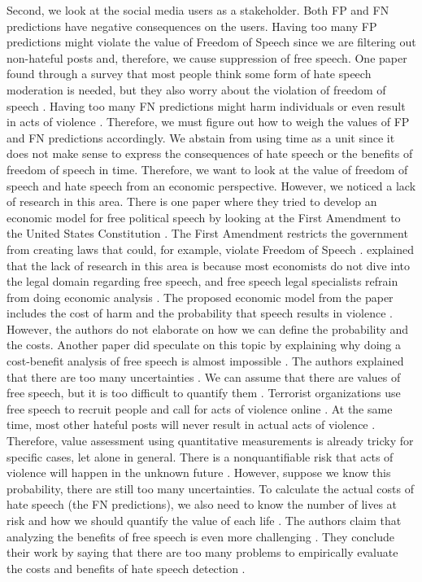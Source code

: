 Second, we look at the social media users as a stakeholder.
%
Both FP and FN predictions have negative consequences on the users.
%
Having too many FP predictions might violate the value of Freedom of Speech since we are filtering out non-hateful posts and, therefore, we cause suppression of free speech.
%
One paper found through a survey that most people think some form of hate speech moderation is needed, but they also worry about the violation of freedom of speech \citep{olteanu2017limits}.
%
Having too many FN predictions might harm individuals or even result in acts of violence \citep{ecri-hate-speech-and-violence}.
%
Therefore, we must figure out how to weigh the values of FP and FN predictions accordingly.
%
We abstain from using time as a unit since it does not make sense to express the consequences of hate speech or the benefits of freedom of speech in time.
%
Therefore, we want to look at the value of freedom of speech and hate speech from an economic perspective.
%
However, we noticed a lack of research in this area.
%
There is one paper where they tried to develop an economic model for free political speech by looking at the First Amendment to the United States Constitution \citep{posner1986free}.
%
The First Amendment restricts the government from creating laws that could, for example, violate Freedom of Speech \citep{first-amendment-white-house}.
%
\citet{posner1986free} explained that the lack of research in this area is because most economists do not dive into the legal domain regarding free speech, and free speech legal specialists refrain from doing economic analysis \citep{posner1986free}.
%
The proposed economic model from the paper includes the cost of harm and the probability that speech results in violence \citep{posner1986free}.
%
However, the authors do not elaborate on how we can define the probability and the costs. Another paper did speculate on this topic by explaining why doing a cost-benefit analysis of free speech is almost impossible \citep{sunstein2018does}.
%
The authors explained that there are too many uncertainties \citep{sunstein2018does}.
%
We can assume that there are values of free speech, but it is too difficult to quantify them \citep{sunstein2018does}.
%
Terrorist organizations use free speech to recruit people and call for acts of violence online \citep{sunstein2018does}.
%
At the same time, most other hateful posts will never result in actual acts of violence \citep{sunstein2018does}.
%
Therefore, value assessment using quantitative measurements is already tricky for specific cases, let alone in general.
%
There is a nonquantifiable risk that acts of violence will happen in the unknown future \citep{sunstein2018does}.
%
However, suppose we know this probability, there are still too many uncertainties.
%
To calculate the actual costs of hate speech (the FN predictions), we also need to know the number of lives at risk and how we should quantify the value of each life \citep{sunstein2018does}.
%
The authors claim that analyzing the benefits of free speech is even more challenging \citep{sunstein2018does}.
%
They conclude their work by saying that there are too many problems to empirically evaluate the costs and benefits of hate speech detection \citep{sunstein2018does}.
%

